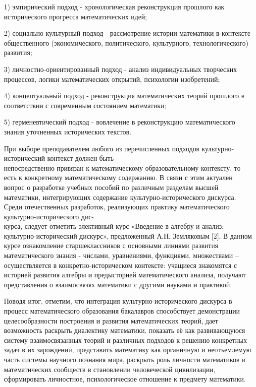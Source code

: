 1) эмпирический подход - хронологическая реконструкция прошлого как исторического прогресса математических идей;

2) социально-культурный подход - рассмотрение истории математики в контексте общественного (экономического, политического, культурного, технологического) развития;

3) личностно-ориентированный подход - анализ индивидуальных творческих процессов, логики математических открытий, психологии изобретений;

4) концептуальный подход - реконструкция математических теорий прошлого в соответствии с современным состоянием математики;

5) герменевтический подход - вовлечение в реконструкцию математического знания уточненных исторических текстов.

При выборе преподавателем любого из перечисленных подходов культурно-исторический контекст должен быть \\не\-посредственно привязан к математическому образовате\-льному контексту, то есть к конкретному математическому содержанию. В связи с этим актуален вопрос о разработке учебных пособий по различным разделам высшей математики, интегрирующих содержание культурно-исторического дискурса. Среди отечественных разработок, реализующих практику математического культурно-исторического дис-\\курса, следует отметить элективный курс «Введение в алгебру и анализ: культурно-исторический дискурс», предложенный А.Н. Земляковым [2]. В данном курсе ознакомление старшеклассников с основными линиями развития математического знания - числами, уравнениями, функциями, множествами – осуществляется в конкретно-историческом контексте: учащиеся знакомятся с историей развития алгебры и предысторией математического анализа, получают представления о взаимосвязях математики с другими науками и практикой.

Поводя итог, отметим, что интеграция культурно-исто\-ри\-ческого дискурса в процесс математического образования бакалавров способствует демонстрации целесообразности построения и развития математических теорий, дает возможность раскрыть диалектику математики, показать её как развивающуюся систему взаимосвязанных теорий и различных подходов к решению конкретных задач в их зарождении, представить математику как органичную и неотъемлемую часть системы научного познания мира, раскрыть роль личности математиков и математических сообществ в становлении человеческой цивилизации, сформировать личностное, психологическое отношение к предмету математики.



